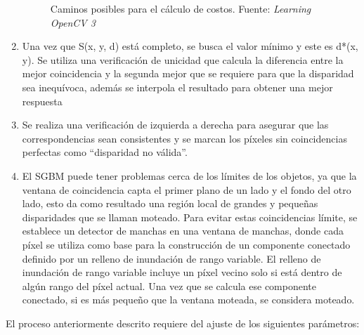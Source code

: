 \begin{enumerate}
\begin{figure}[H]
        \caption[Caminos posibles para el cálculo de costos.]{Caminos posibles para el cálculo de costos. {\footnotesize Fuente: \textit{Learning OpenCV 3} \cite{LearningOpenCV3}}}
        \label{cost_directions}
    \end{figure}
    \item Una vez que S(x, y, d) está completo, se busca el valor mínimo y este es d*(x, y). Se utiliza una verificación de unicidad que calcula la diferencia entre la mejor coincidencia y la segunda mejor que se requiere para que la disparidad sea inequívoca, además se interpola el resultado para obtener una mejor respuesta
    \item Se realiza una verificación de izquierda a derecha para asegurar que las correspondencias sean consistentes y se marcan los píxeles sin coincidencias perfectas como ``disparidad no válida''.
    \item El SGBM puede tener problemas cerca de los límites de los objetos, ya que la ventana de coincidencia capta el primer plano de un lado y el fondo del otro lado, esto da como resultado una región local de grandes y pequeñas disparidades que se llaman moteado. Para evitar estas coincidencias límite, se establece un detector de manchas en una ventana de manchas, donde cada píxel se utiliza como base para la construcción de un componente conectado definido por un relleno de inundación de rango variable. El relleno de inundación de rango variable incluye un píxel vecino solo si está dentro de algún rango del píxel actual. Una vez que se calcula ese componente conectado, si es más pequeño que la ventana moteada, se considera moteado.
\end{enumerate}
El proceso anteriormente descrito requiere del ajuste de los siguientes parámetros:
